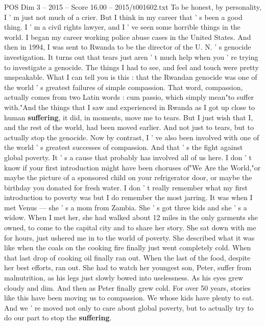 \begin{textsample}{POS Dim 3 – 2015 – Score 16.00 – 2015/t001602.txt}  \label{ex:f3_pos_032}
To be honest, by personality, I ' m just not much of a crier.
But I think in my career that ' s been a good thing.
I ' m a civil rights lawyer, and I ' ve seen some horrible things in the world.
I began my career working police abuse cases in the United States.
And then in 1994, I was sent to Rwanda to be the director of the U.
N. ' s genocide investigation.
It turns out that tears just aren ' t much help when you ' re trying to investigate a genocide.
The things I had to see, and feel and touch were pretty unspeakable.
What I can tell you is this : that the Rwandan genocide was one of the world ' s greatest failures of simple compassion.
That word, compassion, actually comes from two Latin words : cum passio, which simply mean"to suffer with."And the things that I saw and experienced in Rwanda as I got up close to human \textbf{suffering}, it did, in moments, move me to tears.
But I just wish that I, and the rest of the world, had been moved earlier.
And not just to tears, but to actually stop the genocide.
Now by contrast, I ' ve also been involved with one of the world ' s greatest successes of compassion.
And that ' s the fight against global poverty.
It ' s a cause that probably has involved all of us here.
I don ' t know if your first introduction might have been choruses of"We Are the World,"or maybe the picture of a sponsored child on your refrigerator door, or maybe the birthday you donated for fresh water.
I don ' t really remember what my first introduction to poverty was but I do remember the most jarring.
It was when I met Venus — she ' s a mom from Zambia.
She ' s got three kids and she ' s a widow.
When I met her, she had walked about 12 miles in the only garments she owned, to come to the capital city and to share her story.
She sat down with me for hours, just ushered me in to the world of poverty.
She described what it was like when the coals on the cooking fire finally just went completely cold.
When that last drop of cooking oil finally ran out.
When the last of the food, despite her best efforts, ran out.
She had to watch her youngest son, Peter, suffer from malnutrition, as his legs just slowly bowed into uselessness.
As his eyes grew cloudy and dim.
And then as Peter finally grew cold.
For over 50 years, stories like this have been moving us to compassion.
We whose kids have plenty to eat.
And we ' re moved not only to care about global poverty, but to actually try to do our part to stop the \textbf{suffering}.

\end{textsample}

